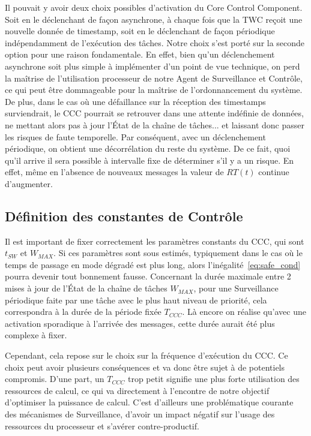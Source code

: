 \documentclass[french, a4paper, 11pt, twoside, pdftex]{StyleThese}
\begin{document}
        Il pouvait y avoir deux choix possibles d'activation du Core Control Component. Soit en le déclenchant de façon asynchrone, à chaque fois que la TWC reçoit une nouvelle donnée de timestamp, soit en le déclenchant de façon périodique indépendamment de l'exécution des tâches. Notre choix s'est porté sur la seconde option pour une raison fondamentale. En effet, bien qu'un déclenchement asynchrone soit plus simple à implémenter d'un point de vue technique, on perd la maîtrise de l'utilisation processeur de notre Agent de Surveillance et Contrôle, ce qui peut être dommageable pour la maîtrise de l'ordonnancement du système. De plus, dans le cas où une défaillance sur la réception des timestamps surviendrait, le CCC pourrait se retrouver dans une attente indéfinie de données, ne mettant alors pas à jour l'État de la chaîne de tâches... et laissant donc passer les risques de faute temporelle. Par conséquent, avec un déclenchement périodique, on obtient une décorrélation du reste du système. De ce fait, quoi qu'il arrive il sera possible à intervalle fixe de déterminer s'il y a un risque. En effet, même en l'absence de nouveaux messages la valeur de $RT(t)$ continue d'augmenter.
        
        
		\subsection{Définition des constantes de Contrôle}
        Il est important de fixer correctement les paramètres constants du CCC, qui sont $t_{SW}$ et $W_{MAX}$.
        Si ces paramètres sont sous estimés, typiquement dans le cas où le temps de passage en mode dégradé est plus long, alors l'inégalité~\ref{eq:safe_cond} pourra devenir tout bonnement fausse. 
        Concernant la durée maximale entre 2 mises à jour de l'État de la chaîne de tâches $W_{MAX}$, pour une Surveillance périodique faite par une tâche avec le plus haut niveau de priorité, cela correspondra à la durée de la période fixée $T_{CCC}$. Là encore on réalise qu'avec une activation sporadique à l'arrivée des messages, cette durée aurait été plus complexe à fixer. 
        
        Cependant, cela repose sur le choix sur la fréquence d'exécution du CCC. Ce choix peut avoir plusieurs conséquences et va donc être sujet à de potentiels compromis. D'une part, un $T_{CCC}$ trop petit signifie une plus forte utilisation des ressources de calcul, ce qui va directement à l'encontre de notre objectif d'optimiser la puissance de calcul. C'est d'ailleurs une problématique courante des mécanismes de Surveillance, d'avoir un impact négatif sur l'usage des ressources du processeur et s'avérer contre-productif.
        
\end{document}
